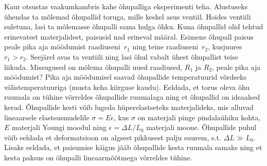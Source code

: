 \setAuthor{}

Kaur otsustas vaakumkambris kahe õhupalliga eksperimenti teha. Alustuseks ühendas
ta mõlemad õhupallid toruga, mille keskel asus ventiil. Hoides ventiili suletuna,
lasi ta mõlemasse õhupalli sama hulga õhku. Kuna õhupallid olid tehtud erinevatest
materjalidest, paisusid nad erineval määral. Esimene õhupall paisus peale pika aja
möödumist raadiuseni~$r_1$ ning teine raadiuseni~$r_2$, kusjuures $r_1 > r_2$.
Seejärel avas ta ventiili ning lasi õhul vabalt ühest õhupallist teise liikuda.
Missugused on mõlema õhupalli uued raadiused, $R_1$ ja $R_2$, peale pika aja
möödumist? Pika aja möödumisel saavad õhupallide temperatuurid võrdseks
välistemperatuuriga (musta keha kiirguse kaudu). Eeldada, et torus oleva õhu
ruumala on tühine võrreldes õhupallide ruumalaga ning et õhupallid on ideaalsed
kerad. Õhupallide kesti võib lugeda hüperelastseteks materjalideks, mis alluvad
lineaarsele elastsusmudelile $\sigma = E\epsilon$, kus $\sigma$ on materjali pinge
pindalaühiku kohta, $E$ materjali Youngi moodul ning $\epsilon = \Delta L / L_0$
materjali moone. Õhupallide puhul võib eeldada et deformatsioon on algsest
pikkusest palju suurem, s.t. $\Delta L \gg L_0$. Lisaks eeldada, et paisumise
käigus jääb õhupallide kesta ruumala samaks ning et kesta paksus on õhupalli
lineaarmõõtmega võrreldes tühine.



\hint

